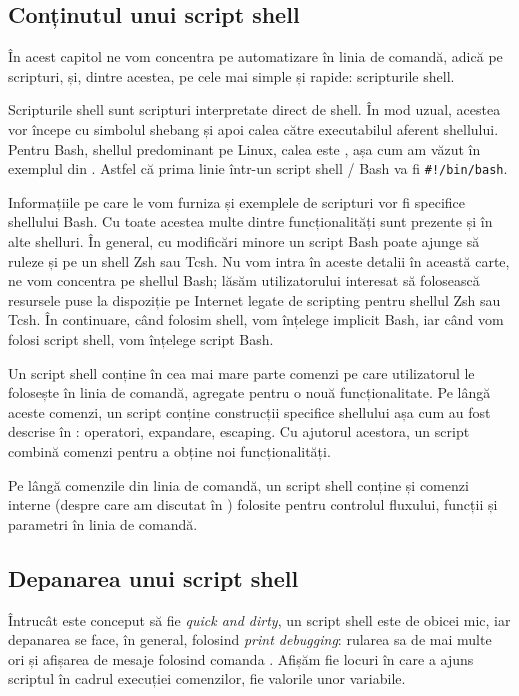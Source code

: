 \subsection{Conținutul unui script shell}
\label{sec:auto:dev:content}

În acest capitol ne vom concentra pe automatizare în
linia de comandă, adică pe scripturi, și, dintre acestea, pe cele mai simple și
rapide: scripturile shell.

Scripturile shell sunt scripturi interpretate direct de shell.
În mod uzual, acestea vor începe cu simbolul shebang și apoi calea către executabilul aferent shellului.
Pentru Bash, shellul predominant pe Linux, calea este , așa cum am văzut în exemplul din .
Astfel că prima linie într-un script shell / Bash va fi \texttt{\#!/bin/bash}.

Informațiile pe care le vom furniza și exemplele de scripturi vor fi specifice shellului Bash.
Cu toate acestea multe dintre funcționalități sunt prezente și în alte shelluri.
În general, cu modificări minore un script Bash poate ajunge să ruleze și pe un shell Zsh sau Tcsh.
Nu vom intra în aceste detalii în această carte, ne vom concentra pe shellul Bash; lăsăm utilizatorului interesat să folosească resursele puse la dispoziție pe Internet legate de scripting pentru shellul Zsh sau Tcsh.
În continuare, când folosim shell, vom înțelege implicit Bash, iar când vom folosi script shell, vom înțelege script Bash.

Un script shell conține în cea mai mare parte comenzi pe care utilizatorul le folosește în linia de comandă, agregate pentru o nouă funcționalitate.
Pe lângă aceste comenzi, un script conține construcții specifice shellului așa cum au fost descrise în : operatori, expandare, escaping.
Cu ajutorul acestora, un script combină comenzi pentru a obține noi funcționalități.

Pe lângă comenzile din linia de comandă, un script shell conține și comenzi interne (despre care am discutat în ) folosite pentru controlul fluxului, funcții și parametri în linia de comandă.

\subsection{Depanarea unui script shell}
\label{sec:auto:dev:debug}

Întrucât este conceput să fie \textit{quick and dirty}, un script shell este de obicei mic, iar depanarea se face, în general, folosind \textit{print debugging}: rularea sa de mai multe ori și afișarea de mesaje folosind comanda .
Afișăm fie locuri în care a ajuns scriptul în cadrul execuției comenzilor, fie valorile unor variabile.

